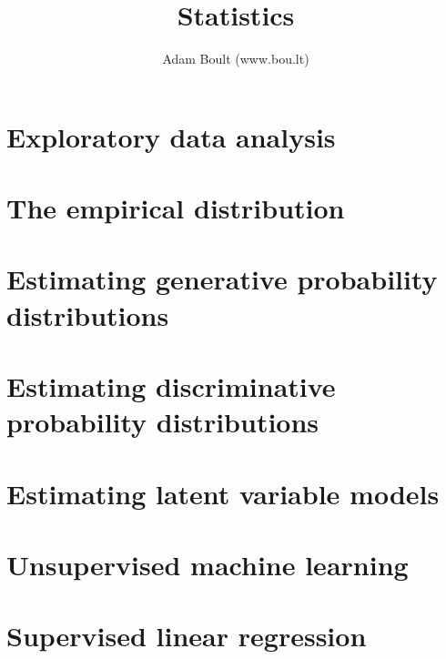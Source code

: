 \documentclass[oneside]{book}
\begin{document}
\author{Adam Boult (www.bou.lt)}
\title{Statistics}
\maketitle

\setcounter{tocdepth}{0}
\tableofcontents



\part{Exploratory data analysis}












\part{The empirical distribution}


\part{Estimating generative probability distributions}















\part{Estimating discriminative probability distributions}






\part{Estimating latent variable models}


\part{Unsupervised machine learning}



\part{Supervised linear regression}





\end{document}
